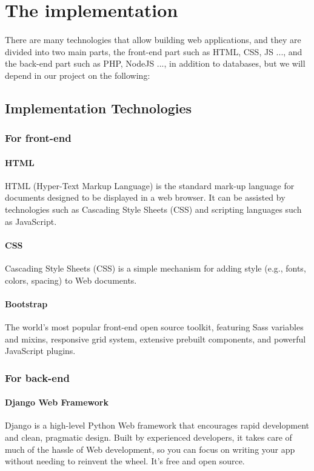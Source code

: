 \section{The implementation}
	\paragraph{}
	There are many technologies that allow building web applications, and they are divided into two main parts, the front-end part such as HTML, CSS, JS ..., and the back-end part such as PHP, NodeJS ..., in addition to databases, but we will depend in our project on the following:
	\subsection{Implementation Technologies}
		\subsubsection{For front-end}
			\paragraph{HTML}
			HTML (Hyper-Text Markup Language) is the standard mark-up language for documents designed to be displayed in a web browser. It can be assisted by technologies such as Cascading Style Sheets (CSS) and scripting languages such as JavaScript.\cite{HTML}
			\paragraph{CSS}
			Cascading Style Sheets (CSS) is a simple mechanism for adding style (e.g., fonts, colors, spacing) to Web documents.\cite{CSS}
			\paragraph{Bootstrap}
			The world’s most popular front-end open source toolkit, featuring Sass variables and mixins, responsive grid system, extensive prebuilt components, and powerful JavaScript plugins.\cite{Bootstrap}
		\subsubsection{For back-end}
			\paragraph{Django Web Framework}
			Django is a high-level Python Web framework that encourages rapid development and clean, pragmatic design. Built by experienced developers, it takes care of much of the hassle of Web development, so you can focus on writing your app without needing to reinvent the wheel. It’s free and open source.\cite{Django}
